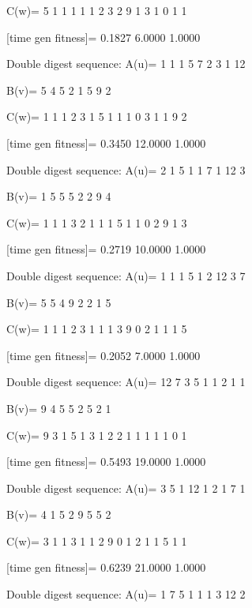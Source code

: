 C(w)=
     5     1     1     1     1     1     2     3     2     9     1     3     1     0     1     1

[time gen fitness]=
    0.1827    6.0000    1.0000

Double digest sequence:
A(u)=
     1     1     1     5     7     2     3     1    12

B(v)=
     5     4     5     2     1     5     9     2

C(w)=
     1     1     1     2     3     1     5     1     1     1     0     3     1     1     9     2

[time gen fitness]=
    0.3450   12.0000    1.0000

Double digest sequence:
A(u)=
     2     1     5     1     1     7     1    12     3

B(v)=
     1     5     5     5     2     2     9     4

C(w)=
     1     1     1     3     2     1     1     1     5     1     1     0     2     9     1     3

[time gen fitness]=
    0.2719   10.0000    1.0000

Double digest sequence:
A(u)=
     1     1     1     5     1     2    12     3     7

B(v)=
     5     5     4     9     2     2     1     5

C(w)=
     1     1     1     2     3     1     1     1     3     9     0     2     1     1     1     5

[time gen fitness]=
    0.2052    7.0000    1.0000

Double digest sequence:
A(u)=
    12     7     3     5     1     1     2     1     1

B(v)=
     9     4     5     5     2     5     2     1

C(w)=
     9     3     1     5     1     3     1     2     2     1     1     1     1     1     0     1

[time gen fitness]=
    0.5493   19.0000    1.0000

Double digest sequence:
A(u)=
     3     5     1    12     1     2     1     7     1

B(v)=
     4     1     5     2     9     5     5     2

C(w)=
     3     1     1     3     1     1     2     9     0     1     2     1     1     5     1     1

[time gen fitness]=
    0.6239   21.0000    1.0000

Double digest sequence:
A(u)=
     1     7     5     1     1     1     3    12     2

